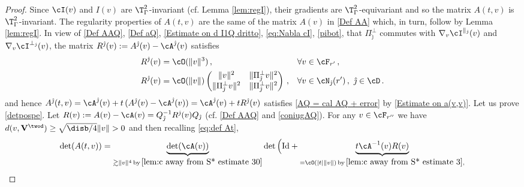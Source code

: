 \documentclass[11pt,a4paper,reqno]{article}
\numberwithin{equation}{section}
\theoremstyle{definition}
\begin{document}
    \begin{proof}
Since $\cI(v)$ and  $I(v)$ 
are $\T^2_\Gamma$-invariant (cf. Lemma \ref{lem:regI}), 
        their gradients are $ \T^2_\Gamma $-equivariant  and so the matrix $A(t,v)$ is $\T^2_\Gamma$-invariant.
The  regularity properties of 
$ A (t,v) $ are the same  of 
 the matrix  $ A(v)$ 
  in \eqref{Def AA} which, in turn, follow by  Lemma \ref{lem:regI}.
In view of 
 \eqref{Def AAQ}, \eqref{Def aQ}, \eqref{Estimate on d I1Q dritto}, 
\eqref{eq:Nabla cI}, \eqref{pibot},
that $ \Pi^\bot_{\hat \jmath}  $ commutes with  $ \nabla_v \cI^{\parallel_{\hat \jmath}} (v)  $ and $ \nabla_v \cI^{\bot_{\hat \jmath}} (v)  $,
 the matrix
$R^{\hat \jmath}(v):=A^{\hat \jmath}(v) - \cA^{\hat \jmath}(v)$ satisfies
\begin{equation}\label{eq:inside lemma AQ = cal AQ + error}
    \begin{aligned}
        & R^{\hat \jmath}(v) =
            \cO(\|v\|^3) \, , & & 
            \forall v\in \cF_{r'} \, , \\
        &  R^{\hat \jmath}(v)=
            \cO(\|v\|)\begin{pmatrix}
                \|v\|^2 & \|
                \Pi_{\hat \jmath}^\bot v\|^2\\
                \| \Pi_{\hat \jmath}^\bot v \|^2 & \| \Pi_{\hat \jmath}^\bot v \|^2
            \end{pmatrix} \, , & & 
            \forall 
            v\in \cN_{\hat \jmath}(r')\, , \ \hat \jmath\in\cD \, .
            \end{aligned}
\end{equation}
and hence $ A^{\hat \jmath}(t,v) = \cA^{\hat \jmath} (v) +  t \, (A^{\hat \jmath}(v) - \cA^{\hat \jmath}(v))=\cA^{\hat \jmath}(v)+tR^{\hat \jmath}(v)$ satisfies 
 \eqref{AQ = cal AQ + error} by 
\eqref{Estimate on a(v,v)}.
Let us prove \eqref{detpospe}.  
        Let $ R(v):=A(v)-\cA(v)=Q_{\hat \jmath}^{-1} R^{\hat \jmath}(v) Q_{\hat \jmath}$ (cf. \eqref{Def AAQ} and \eqref{coniugAQ}).
        For any  $ v\in \cF_{r''} $ 
        we have       
        $d(v,{\bf V}^{\twod})\geq \sqrt{\disb/4}\|v\|>0$ and then recalling  \eqref{eq:def At}, %
        $$
            \det (A(t,v))= 
            \underbrace{\det (\cA(v))}_{ \gtrsim \|v\|^4 \, \text{by} \, \eqref{lem:c away from S* estimate 30}}
            \det \Big( \text{Id} +
            \underbrace{t\cA^{-1}(v)R(v)}_{= \cO(|t|\|v\|) \, \text{by} \,
            \eqref{lem:c away from S* estimate 3}, %
}$$
\end{proof}
\end{document}
